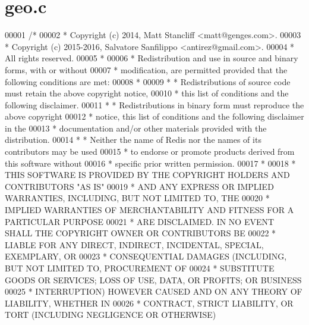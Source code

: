 \hypertarget{geo_8c_source}{}\section{geo.\+c}
\label{geo_8c_source}

\begin{DoxyCode}
00001 \textcolor{comment}{/*}
00002 \textcolor{comment}{ * Copyright (c) 2014, Matt Stancliff <matt@genges.com>.}
00003 \textcolor{comment}{ * Copyright (c) 2015-2016, Salvatore Sanfilippo <antirez@gmail.com>.}
00004 \textcolor{comment}{ * All rights reserved.}
00005 \textcolor{comment}{ *}
00006 \textcolor{comment}{ * Redistribution and use in source and binary forms, with or without}
00007 \textcolor{comment}{ * modification, are permitted provided that the following conditions are met:}
00008 \textcolor{comment}{ *}
00009 \textcolor{comment}{ *   * Redistributions of source code must retain the above copyright notice,}
00010 \textcolor{comment}{ *     this list of conditions and the following disclaimer.}
00011 \textcolor{comment}{ *   * Redistributions in binary form must reproduce the above copyright}
00012 \textcolor{comment}{ *     notice, this list of conditions and the following disclaimer in the}
00013 \textcolor{comment}{ *     documentation and/or other materials provided with the distribution.}
00014 \textcolor{comment}{ *   * Neither the name of Redis nor the names of its contributors may be used}
00015 \textcolor{comment}{ *     to endorse or promote products derived from this software without}
00016 \textcolor{comment}{ *     specific prior written permission.}
00017 \textcolor{comment}{ *}
00018 \textcolor{comment}{ * THIS SOFTWARE IS PROVIDED BY THE COPYRIGHT HOLDERS AND CONTRIBUTORS "AS IS"}
00019 \textcolor{comment}{ * AND ANY EXPRESS OR IMPLIED WARRANTIES, INCLUDING, BUT NOT LIMITED TO, THE}
00020 \textcolor{comment}{ * IMPLIED WARRANTIES OF MERCHANTABILITY AND FITNESS FOR A PARTICULAR PURPOSE}
00021 \textcolor{comment}{ * ARE DISCLAIMED. IN NO EVENT SHALL THE COPYRIGHT OWNER OR CONTRIBUTORS BE}
00022 \textcolor{comment}{ * LIABLE FOR ANY DIRECT, INDIRECT, INCIDENTAL, SPECIAL, EXEMPLARY, OR}
00023 \textcolor{comment}{ * CONSEQUENTIAL DAMAGES (INCLUDING, BUT NOT LIMITED TO, PROCUREMENT OF}
00024 \textcolor{comment}{ * SUBSTITUTE GOODS OR SERVICES; LOSS OF USE, DATA, OR PROFITS; OR BUSINESS}
00025 \textcolor{comment}{ * INTERRUPTION) HOWEVER CAUSED AND ON ANY THEORY OF LIABILITY, WHETHER IN}
00026 \textcolor{comment}{ * CONTRACT, STRICT LIABILITY, OR TORT (INCLUDING NEGLIGENCE OR OTHERWISE)}

\end{DoxyCode}
